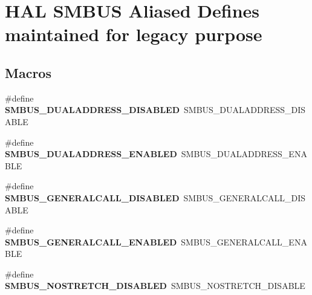 \hypertarget{group___h_a_l___s_m_b_u_s___aliased___defines}{}\section{H\+AL S\+M\+B\+US Aliased Defines maintained for legacy purpose}
\label{group___h_a_l___s_m_b_u_s___aliased___defines}
\subsection*{Macros}
\begin{DoxyCompactItemize}
\item 
\#define {\bfseries S\+M\+B\+U\+S\+\_\+\+D\+U\+A\+L\+A\+D\+D\+R\+E\+S\+S\+\_\+\+D\+I\+S\+A\+B\+L\+ED}~S\+M\+B\+U\+S\+\_\+\+D\+U\+A\+L\+A\+D\+D\+R\+E\+S\+S\+\_\+\+D\+I\+S\+A\+B\+LE\hypertarget{group___h_a_l___s_m_b_u_s___aliased___defines_gaddbad34ded349c11686df6c08aa6471a}{}\label{group___h_a_l___s_m_b_u_s___aliased___defines_gaddbad34ded349c11686df6c08aa6471a}

\item 
\#define {\bfseries S\+M\+B\+U\+S\+\_\+\+D\+U\+A\+L\+A\+D\+D\+R\+E\+S\+S\+\_\+\+E\+N\+A\+B\+L\+ED}~S\+M\+B\+U\+S\+\_\+\+D\+U\+A\+L\+A\+D\+D\+R\+E\+S\+S\+\_\+\+E\+N\+A\+B\+LE\hypertarget{group___h_a_l___s_m_b_u_s___aliased___defines_ga40e0af7474fce8b9658f0bb0bd5dcdb5}{}\label{group___h_a_l___s_m_b_u_s___aliased___defines_ga40e0af7474fce8b9658f0bb0bd5dcdb5}

\item 
\#define {\bfseries S\+M\+B\+U\+S\+\_\+\+G\+E\+N\+E\+R\+A\+L\+C\+A\+L\+L\+\_\+\+D\+I\+S\+A\+B\+L\+ED}~S\+M\+B\+U\+S\+\_\+\+G\+E\+N\+E\+R\+A\+L\+C\+A\+L\+L\+\_\+\+D\+I\+S\+A\+B\+LE\hypertarget{group___h_a_l___s_m_b_u_s___aliased___defines_gac6c7ef3413e8533e140fda0f1c882a0e}{}\label{group___h_a_l___s_m_b_u_s___aliased___defines_gac6c7ef3413e8533e140fda0f1c882a0e}

\item 
\#define {\bfseries S\+M\+B\+U\+S\+\_\+\+G\+E\+N\+E\+R\+A\+L\+C\+A\+L\+L\+\_\+\+E\+N\+A\+B\+L\+ED}~S\+M\+B\+U\+S\+\_\+\+G\+E\+N\+E\+R\+A\+L\+C\+A\+L\+L\+\_\+\+E\+N\+A\+B\+LE\hypertarget{group___h_a_l___s_m_b_u_s___aliased___defines_ga395828b6264255bd2a51c17f3b473fea}{}\label{group___h_a_l___s_m_b_u_s___aliased___defines_ga395828b6264255bd2a51c17f3b473fea}

\item 
\#define {\bfseries S\+M\+B\+U\+S\+\_\+\+N\+O\+S\+T\+R\+E\+T\+C\+H\+\_\+\+D\+I\+S\+A\+B\+L\+ED}~S\+M\+B\+U\+S\+\_\+\+N\+O\+S\+T\+R\+E\+T\+C\+H\+\_\+\+D\+I\+S\+A\+B\+LE\hypertarget{group___h_a_l___s_m_b_u_s___aliased___defines_ga4fd6421c8f8dbb020249f49dd45a786e}{}\label{group___h_a_l___s_m_b_u_s___aliased___defines_ga4fd6421c8f8dbb020249f49dd45a786e}


\end{DoxyCompactItemize}
